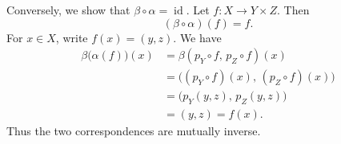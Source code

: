 \medskip
\noindent Conversely, we show that $\beta\circ\alpha=\operatorname{id}$.
Let $f:X\to Y\times Z$. Then
\[
 (\beta\circ\alpha)(f)=f.
\]
For $x\in X$, write $f(x)=(y,z)$. We have
\[
\begin{aligned}
 \beta\bigl(\alpha(f)\bigr)(x)
   &=\beta(p_Y\circ f,\,p_Z\circ f)(x)\\
   &=\bigl((p_Y\circ f)(x),\,(p_Z\circ f)(x)\bigr)\\
   &=\bigl(p_Y(y,z),\,p_Z(y,z)\bigr)\\
   &=(y,z)=f(x).
\end{aligned}
\]
Thus the two correspondences are mutually inverse.
